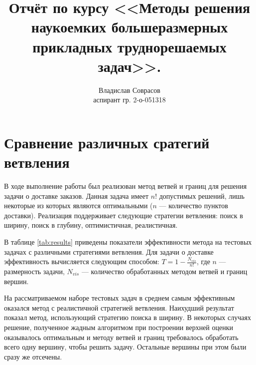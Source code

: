 \documentclass[a4paper]{article}
\begin{document}
\title{Отчёт по курсу <<Методы решения наукоемких большеразмерных прикладных труднорешаемых задач>>.}
\author{Владислав Соврасов\\ аспирант гр. 2-о-051318}
\date{}
\maketitle

\section{Сравнение различных сратегий ветвления}

В ходе выполнение работы был реализован метод ветвей и границ для решения задачи о доставке заказов.
Данная задача имеет $n !$ допустимых решений, лишь некоторые из которых являются оптимальными
($n$ --- количество пунктов доставки).
Реализация поддерживает следующие стратегии ветвления: поиск в ширину, поиск в глубину,
оптимистичная, реалистичная.

В таблице \ref{tab:results} приведены показатели эффективности метода на тестовых задачах с различными стратегиями ветвления.
Для задачи о доставке эффективность вычисляется следующим способом: $T=1 - \frac{N_{vis}}{n!}$, где $n$ --- размерность
задачи, $N_{vis}$ --- количество обработанных методом ветвей и границ вершин.

На рассматриваемом наборе тестовых задач в среднем самым эффективным оказался метод с реалистичной стратегией
ветвления. Наихудший результат показал метод, использующий стратегию поиска в ширину.
В некоторых случаях решение, полученное жадным алгоритмом при построении верхней оценки оказывалось оптимальным
и методу ветвей и границ требовалось обработать всего одну вершину, чтобы решить задачу. Остальные вершины при этом
были сразу же отсечены.
\end{document}
